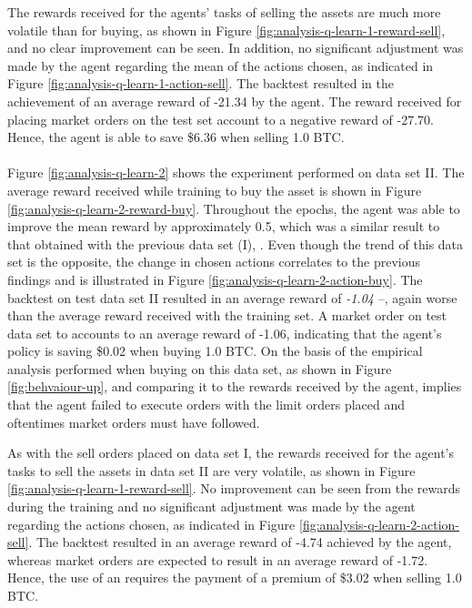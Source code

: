 The rewards received for the agents' tasks of selling the assets are much more volatile than for buying, as shown in Figure \ref{fig:analysis-q-learn-1-reward-sell}, and no clear improvement can be seen.
In addition, no significant adjustment was made by the agent regarding the mean of the actions chosen, as indicated in Figure \ref{fig:analysis-q-learn-1-action-sell}.
The backtest resulted in the achievement of an average reward of -21.34 by the agent.
The reward received for placing market orders on the test set account to a negative reward of -27.70.
Hence, the agent is able to save \$6.36 when selling 1.0 BTC.
\\
\\
Figure \ref{fig:analysis-q-learn-2} shows the experiment performed on data set II.
The average reward received while training to buy the asset is shown in Figure \ref{fig:analysis-q-learn-2-reward-buy}.
Throughout the epochs, the agent was able to improve the mean reward by approximately 0.5, which was a similar result to that obtained with the previous data set (I), .
Even though the trend of this data set is the opposite, the change in chosen actions correlates to the previous findings and is illustrated in Figure \ref{fig:analysis-q-learn-2-action-buy}.
The backtest on test data set II resulted in an average reward of \textit{-1.04} --,  again worse than the average reward received with the training set.
A market order on test data set to accounts to an average reward of -1.06, indicating that the agent's policy is saving \$0.02 when buying 1.0 BTC.
On the basis of the empirical analysis performed when buying on this data set, as shown in Figure \ref{fig:behvaiour-up}, and comparing it to the rewards received by the agent, implies that the agent failed to execute orders with the limit orders placed and oftentimes market orders must have followed.

As with the sell orders placed on data set I, the rewards received for the agent's tasks to sell the assets in data set II are very volatile, as shown in Figure \ref{fig:analysis-q-learn-1-reward-sell}.
No improvement can be seen from the rewards during the training and no significant adjustment was made by the agent regarding the actions chosen, as indicated in Figure \ref{fig:analysis-q-learn-2-action-sell}.
The backtest resulted in an average reward of -4.74 achieved by the agent, whereas market orders are expected to result in an average reward of -1.72.
Hence, the use of an requires the payment of a premium of \$3.02 when selling 1.0 BTC.

